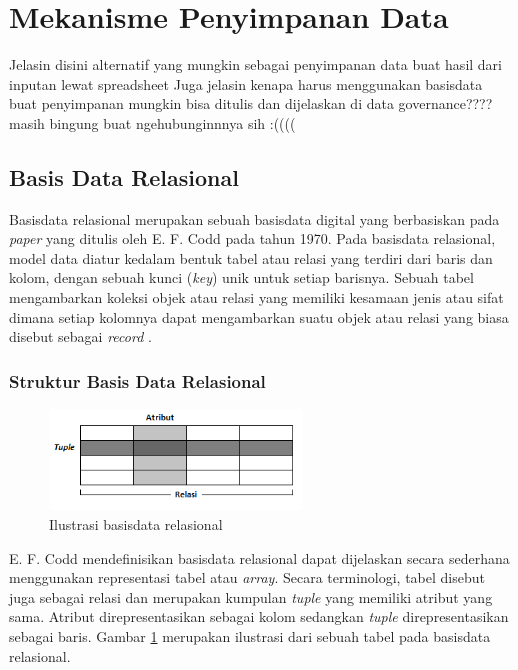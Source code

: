 \section{Mekanisme Penyimpanan Data}
Jelasin disini alternatif yang mungkin sebagai penyimpanan data buat hasil dari inputan lewat spreadsheet
Juga jelasin kenapa harus menggunakan basisdata buat penyimpanan
mungkin bisa ditulis dan dijelaskan di data governance???? 
masih bingung buat ngehubunginnnya sih :((((


\subsection{Basis Data Relasional}
Basisdata relasional merupakan sebuah basisdata digital yang berbasiskan pada \textit{paper} yang ditulis oleh E. F. Codd pada tahun 1970. Pada basisdata relasional, model data diatur kedalam bentuk tabel atau relasi yang terdiri dari baris dan kolom, dengan sebuah kunci (\textit{key}) unik untuk setiap barisnya. Sebuah tabel mengambarkan koleksi objek atau relasi yang memiliki kesamaan jenis atau sifat dimana setiap kolomnya dapat mengambarkan suatu objek atau relasi yang biasa disebut sebagai \textit{record} \parencite{codd1970relational, OracleRDB}.

    \subsubsection{Struktur Basis Data Relasional}
    \begin{figure}[htb]
        \centering
        \includegraphics[width=0.6\textwidth]{resources/chapter-2-relational-db.png}
        \caption{Ilustrasi basisdata relasional}
        \label{IlustrasiRDB}
    \end{figure}
    E. F. Codd mendefinisikan basisdata relasional dapat dijelaskan secara sederhana menggunakan representasi tabel atau \textit{array}. Secara terminologi, tabel disebut juga sebagai relasi dan merupakan kumpulan \textit{tuple} yang memiliki atribut yang sama. Atribut direpresentasikan sebagai kolom sedangkan \textit{tuple} direpresentasikan sebagai baris. Gambar \ref{IlustrasiRDB} merupakan ilustrasi dari sebuah tabel pada basisdata relasional.

